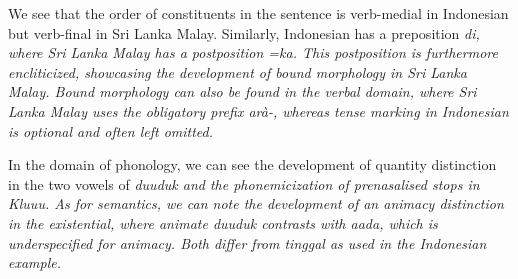We see that the order of constituents in the sentence is verb-medial in Indonesian but verb-final in Sri Lanka Malay. Similarly, Indonesian has a preposition \em di\em, where Sri Lanka Malay has a postposition \em=ka\em. This postposition is furthermore encliticized, showcasing the development of bound morphology in Sri Lanka Malay. Bound morphology can also be found in the verbal domain, where Sri Lanka Malay uses the obligatory prefix \em arà-\em, whereas tense marking in Indonesian is optional and often left omitted.  

In the domain of phonology, we can see the development of quantity distinction in the two vowels of \em duuduk \em and the phonemicization of prenasalised stops in \em Kluu{\umb}u\em. As for semantics, we can note the development of an animacy distinction in the existential, where animate \em duuduk \em  contrasts with  \em aada\em, which is underspecified for animacy. Both differ from \em tinggal \em as used in the Indonesian example. 


